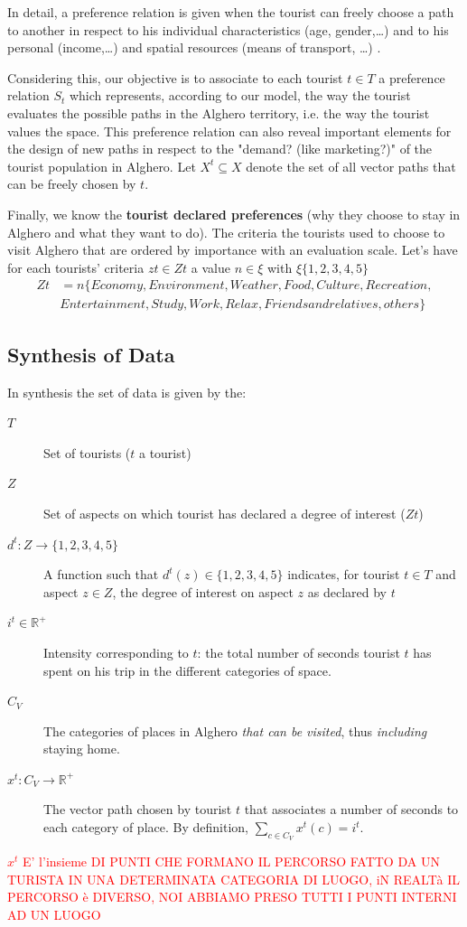 \documentclass[a4paper]{article}
\begin{document}
 In detail, a preference relation is given when the tourist can freely choose a path to another in respect to his individual characteristics (age, gender,\dots) and to his personal (income,\dots) and spatial resources (means of transport, \dots) \cite{Sen1999}.

  Considering this, our objective is to associate to each tourist $t \in T$ a preference relation $S_t$ which represents, according to our model, the way the tourist evaluates the possible paths in the Alghero territory, i.e. the way the tourist values the space. This preference relation can also reveal important elements for the design of new paths in respect to the "demand? (like marketing?)" of the tourist population in Alghero. Let $X^t {\subseteq}X$ denote the set of all vector paths that can be freely  chosen by $t$.


Finally, we know the \textbf{tourist declared preferences} (why they choose to stay in Alghero and what they want to do). The criteria the tourists used to choose to visit Alghero that are ordered by importance with an evaluation scale. Let's have for each tourists' criteria $zt \in Zt$ a value $n \in \xi$ with $\xi\{1,2,3,4,5\}$
\begin{equation}
\begin{split}
Zt&=n\{Economy,Environment,Weather,Food,Culture,Recreation,\\
&Entertainment,Study,Work,Relax,Friends and relatives,others\}
\end{split}
\end{equation}


\subsection{Synthesis of Data}
In synthesis the set of data is given by the:
\begin{description}
	\item[$T$] Set of tourists ($t$ a tourist)
	\item[$Z$] Set of aspects on which tourist has declared a degree of interest ($Zt$)
	\item[$d^t: Z \rightarrow \{1, 2, 3, 4, 5\}$] A function such that $d^t(z) \in \{1, 2, 3, 4, 5\}$ indicates, for tourist $t \in T$ and aspect $z \in Z$, the degree of interest on aspect $z$ as declared by $t$
	\item[$i^t \in {\mathbb{R}^+}$] Intensity corresponding to $t$: the total number of seconds tourist $t$ has spent on his trip in the different categories of space.
	\item[$C_V$] The categories of places in Alghero \emph{that can be visited}, thus \emph{including} staying home.
    \item[$x^t: C_V \rightarrow {\mathbb{R}^+}$] The vector path chosen by tourist $t$ that associates a number of seconds to each category of place. By definition, $\sum_{c \in C_V} x^t(c) = i^t$.
       \end{description}
\textcolor {red}{$x^t$ E' l'insieme DI PUNTI CHE FORMANO IL PERCORSO FATTO DA UN TURISTA IN UNA DETERMINATA CATEGORIA DI LUOGO, iN REALTà IL PERCORSO è DIVERSO, NOI ABBIAMO PRESO TUTTI I PUNTI INTERNI AD UN LUOGO}
\end{document}
